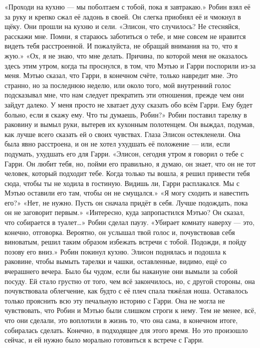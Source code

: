 \documentclass[a4paper,12pt]{book}
\begin{document}
	«Проходи на кухню — мы поболтаем с тобой, пока я завтракаю.»
	Робин взял её за руку и крепко сжал её ладонь в своей. Он слегка приобнял её и чмокнул в щёку. Они прошли на кухню и сели.
	«Элисон, что случилось? Не стесняйся, расскажи мне. Помни, я стараюсь заботиться о тебе, и мне совсем не нравится видеть тебя расстроенной. И пожалуйста, не обращай внимания на то, что я жую.»
	«Ох, я не знаю, что мне делать. Причина, по которой меня не оказалось здесь этим утром, когда ты проснулся, в том, что Мэтью и Гарри поспорили из-за меня. Мэтью сказал, что Гарри, в конечном счёте, только навредит мне. Это странно, но за последнюю неделю, или около того, мой внутренний голос подсказывал мне, что нам следует прекратить эти отношения, прежде чем они зайдут далеко. У меня просто не хватает духу сказать обо всём Гарри. Ему будет больно, если я скажу ему. Что ты думаешь, Робин?»
	Робин поставил тарелку в раковину и вымыл руки, вытерев их кухонным полотенцем. Он выждал, подумав, как лучше всего сказать ей о своих чувствах. Глаза Элисон остекленели. Она была явно расстроена, и он не хотел ухудшать её положение — или, если подумать, ухудшать его для Гарри.
	«Элисон, сегодня утром я говорил о тебе с Гарри. Он любит тебя, но, пойми его правильно, я думаю, он знает, что он не тот человек, который подходит тебе. Когда только ты вошла, я решил привести тебя сюда, чтобы ты не ходила в гостиную. Видишь ли, Гарри расплакался. Мы с Мэтью оставили его там, чтобы он не смущался.»
	«Я могу сходить и навестить его?»
	«Нет, не нужно. Пусть он сначала придёт в себя. Лучше подождать, пока он не заговорит первым.»
	«Интересно, куда запропастился Мэтью? Он сказал, что собирается в туалет…»
	Робин сделал паузу.
	«Убирает комнату наверху — это, конечно, отговорка. Вероятно, он услышал твой голос и, почувствовав себя виноватым, решил таким образом избежать встречи с тобой. Подожди, я пойду позову его вниз.»
	Робин покинул кухню. Элисон поднялась и подошла к раковине, чтобы вымыть тарелки и чашки, оставленные, видимо, ещё со вчерашнего вечера. Было бы чудом, если бы накануне они вымыли за собой посуду. Ей стало грустно от того, чем всё закончилось, но, с другой стороны, она почувствовала облегчение, как будто с её плеч спала тяжёлая ноша. Оставалось только прояснить всю эту печальную историю с Гарри.
	Она не могла не чувствовать, что Робин и Мэтью были слишком строги к нему. Тем не менее, всё, что они сделали, это воплотили в жизнь то, что она сама, в конечном итоге, собиралась сделать. Конечно, в подходящее для этого время. Но это произошло сейчас, и ей нужно было морально готовиться к встрече с Гарри.
\end{document}
